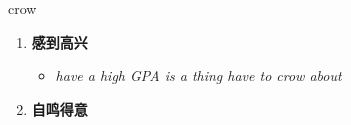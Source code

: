 
\begin{frame}
{\huge crow}
\begin{center}
\begin{enumerate}\Large
  \item \textbf{感到高兴}
  \begin{itemize}
    \item \em{\Large{have a high GPA is a thing have to crow about}}
  \end{itemize}
  \item \textbf{自鸣得意}
\end{enumerate}
\end{center}
\end{frame}
